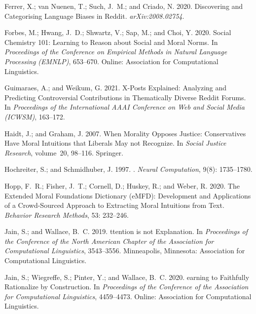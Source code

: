 \documentclass[letterpaper]{article} %
\begin{document}
\begin{thebibliography}{46}
Ferrer, X.; van Nuenen, T.; Such, J.~M.; and Criado, N. 2020.
\newblock Discovering and Categorising Language Biases in {Reddit}.
\newblock \emph{arXiv:2008.02754}.

Forbes, M.; Hwang, J.~D.; Shwartz, V.; Sap, M.; and Choi, Y. 2020.
\newblock Social Chemistry 101: {L}earning to Reason about Social and Moral
  Norms.
\newblock In \emph{Proceedings of the Conference on Empirical Methods in Natural Language Processing (EMNLP)}, 653--670. Online: Association for
  Computational Linguistics.

Guimaraes, A.; and Weikum, G. 2021.
\newblock X-Posts Explained: {Analyzing} and Predicting Controversial
  Contributions in Thematically Diverse Reddit Forums.
\newblock In \emph{Proceedings of the International AAAI Conference on Web and Social Media (ICWSM)}, 163--172.

Haidt, J.; and Graham, J. 2007.
\newblock When Morality Opposes Justice: {C}onservatives Have Moral Intuitions
  that Liberals May not Recognize.
\newblock In \emph{Social Justice Research}, volume~20, 98--116. Springer.

Hochreiter, S.; and Schmidhuber, J. 1997.
.
\newblock \emph{Neural Computation}, 9(8): 1735--1780.

Hopp, F.~R.; Fisher, J.~T.; Cornell, D.; Huskey, R.; and Weber, R. 2020.
\newblock The {E}xtended Moral Foundations Dictionary ({eMFD}): {D}evelopment
  and Applications of a Crowd-Sourced Approach to Extracting Moral Intuitions
  from Text.
\newblock \emph{Behavior Research Methods}, 53: 232--246.

Jain, S.; and Wallace, B.~C. 2019.
ttention is not {E}xplanation.
\newblock In \emph{Proceedings of the Conference of the North American Chapter of the Association for Computational Linguistics}, 3543--3556. Minneapolis, Minnesota: Association for
  Computational Linguistics.

Jain, S.; Wiegreffe, S.; Pinter, Y.; and Wallace, B.~C. 2020.
earning to Faithfully Rationalize by Construction.
\newblock In \emph{Proceedings of the Conference of the Association for Computational Linguistics}, 4459--4473. Online: Association for
  Computational Linguistics.


\end{thebibliography}
\end{document}
